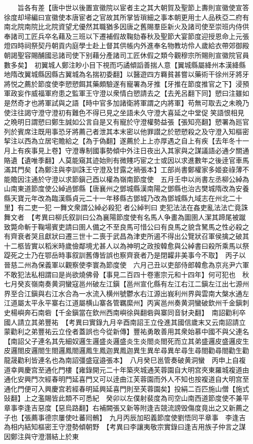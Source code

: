 　　旨各有差【唐中世以後置宣徽院以宦者主之其大朝賀及聖節上夀則宣徽使宣答徐度却埽編曰宣徽使本唐宦者之官故其所掌皆瑣細之事本朝更用士人品秩亞二府有南北院南院比北院資望尤優然其職猶多因唐之舊賜羣臣新火及諸司使至崇班内侍供奉諸司工匠兵卒名藉及三班以下遷補假故鞠劾春秋及聖節大宴節度迎授恩命上元張燈四時祠祭契丹朝貢内庭學士赴上督其供帳内外進奉名物教坊伶人歲給衣帶郊御殿朝謁聖容賜酺國忌諸司使下别藉分產諸司工匠休假之類今觀穆宗所賜則宣徽院官員數多矣】　初翼城人鄭注眇小目下視而巧譎傾謟善揣人意【翼城縣屬絳州本漢絳縣地隋改翼城縣因縣古翼城為名揣初委翻】以醫遊四方羇貧甚嘗以藥術干徐州牙將牙將悦之薦於節度使李愬愬餌其藥頗驗遂有寵署為牙推【牙推在節度推官之下】浸預軍政妄作威福軍府患之監軍王守澄以衆情白愬請去之【去羌呂翻下同】愬曰注雖如是然奇才也將軍試與之語【時中官多加諸衛將軍謂之内將軍】苟無可取去之未晩乃使注往謁守澄守澄初有難色不得已見之坐語未久守澄大喜延之中堂促笑語恨相見之晩明日謂愬曰鄭生誠如公言自是又有寵於守澄權勢益張【張知亮翻】愬署為廵官列於賓席注既用事恐牙將薦己者泄其本末密以他罪譛之於愬愬殺之及守澄入知樞密挈注以西為立居宅贍給之【為于偽翻】遂薦於上上亦厚遇之自上有疾【去年冬十一月上有疾事見上卷】守澄專制國事勢傾中外注日夜出入其家與之謀議語必通夕關通賂遺【遺唯季翻】人莫能窺其迹始則有微賤巧宦之士或因以求進數年之後逹官車馬滿其門矣【為鄭注與李訓誅王守澄及甘露之禍張本】工部尚書鄭權家多姬妾祿薄不能贍因注通於守澄以求節鎭己酉以權為嶺南節度使　五月壬申以尚書左丞柳公綽為山南東道節度使公綽過鄧縣【唐襄州之鄧城縣漢南陽之鄧縣也治古樊城隋改為安養縣天寶元年改為臨漢縣貞元二十一年移縣古鄧城乃改為鄧城縣九域志在州北二十里】有二吏一犯一舞文衆謂公綽必殺犯者公綽判曰吏犯法法在姦吏亂法法亡竟誅舞文者　【考異曰柳氏叙訓曰公為襄陽節度使有名馬人争畫為圖圉人潔其蹄尾被蹴致斃命斬于鞠場賓吏請曰圉人備之不至良馬可惜公曰有良馬之貌含駑馬之性必殺之有齊衰者哭且獻狀曰遷三世十二喪于武昌為津吏所遏不得出公覽狀召軍侯擒之破其十二柩皆實以稻米時歲儉鄰境尤甚人以為神明之政按韓愈與公綽書曰殺所乘馬以祭踶死之士乃在鄂岳時事叙訓舊傳皆誤也察齊衰者乃是閉糶非美事今不取】　丙子以晉慈二州為保義軍以觀察使李寰為節度使　六月己丑以吏部侍郎韓愈為京兆尹六軍不敢犯法私相謂曰是尚欲燒佛骨【事見二百四十卷憲宗元和十四年】何可犯也　秋七月癸亥嶺南奏黄洞蠻寇邕州破左江鎭【邕州宣化縣有左江右江二鎭左江出七源州界至合江鎭與右江水合為一水流入横州號鬱水右江源出峩利州界與雲南大槃水通左江道屬太平永平寨右江道屬横山寨各管羈縻州】丙寅邕州奏黄洞蠻破欽州千金鎭刺史楊嶼奔石南砦【千金鎭當在欽州西南嶼徐與翻砦與寨同音豺夬翻】　南詔勸利卒國人請立其弟豐祐　【考異曰實錄九月辛酉南詔王立佺進其國信歲末又云南詔請立蒙勸利之弟豐祐云立佺者蓋誤也今從新傳】豐祐勇敢善用其衆始慕中國不與父連名【南詔父子連名其先細奴邏生邏盛炎邏盛炎生炎閤炎閤死而立其弟盛邏皮盛邏皮生皮邏閤皮邏閤生閤邏鳳閤邏鳳生鳳迦異鳳迦異生異牟尋異牟尋生尋閤勸尋閤勸生勸龍晟勸利皆連名也為南詔彊盛寇邉張本】　八月癸巳邕管奏破黄洞蠻　丙申上自複道幸興慶宫至通化門樓【雍錄開元二十年築夾城通芙蓉園自大明宫夾東羅城複道由通化安興門次經春明門延喜門又可以逹曲江芙蓉園而外人不知也按複道自大明宫至通化門便可入興慶宫若經春明延興延喜門則至芙蓉園矣】投絹二百匹施山僧【施式䜴翻】上之濫賜皆此類不可悉紀　癸卯以左僕射裴度為司空山南西道節度使不兼平章事李逢吉惡度【惡烏路翻】右補闕張又新等附逢吉競流謗毁傷度竟出之又新薦之子也【張薦事德宗屢使吐蕃囘鶻】　九月丙辰加昭義節度使劉悟同平章事　李逢吉為相内結知樞密王守澄勢傾朝野　【考異曰李讓夷敬宗實錄曰逢吉用族子仲言之謀因鄭注與守澄潛結上於東